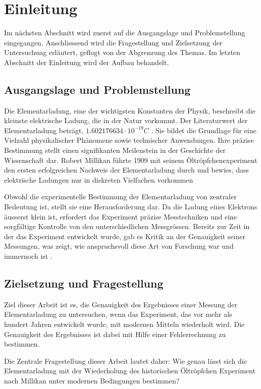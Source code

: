 \chapter{Einleitung}
Im nächsten Abschnitt wird zuerst auf die Ausgangslage und Problemstellung eingegangen. Anschliessend wird die Fragestellung und Zielsetzung der Untersuchung erläutert, geflogt von der Abgrenzung des Themas. Im letzten Abschnitt der Einleitung wird der Aufbau behandelt.

\section{Ausgangslage und Problemstellung}\label{sec:ausgangslage}
Die Elementarladung, eine der wichtigsten Konstanten der Physik, beschreibt die kleinste elektrische Ladung, die in der Natur vorkommt. Der Literaturwert der Elementarladung beträgt, $1.602176634 \cdot 10^{-19} C$ \parencite[123]{fundamentum_mathe}. Sie bildet die Grundlage für eine Vielzahl physikalischer Phänomene sowie technischer Anwendungen. Ihre präzise Bestimmung stellt einen signifikanten Meilenstein in der Geschichte der Wissenschaft dar. Robert Millikan führte 1909 mit seinem Öltröpfchenexperiment den ersten erfolgreichen Nachweis der Elementarladung durch und bewies, dass elektrische Ladungen nur in diskreten Vielfachen vorkommen \parencite{PhysRevSeriesI.32.349}

Obwohl die experimentelle Bestimmung der Elementarladung von zentraler Bedeutung ist, stellt sie eine Herausforderung dar. Da die Ladung eines Elektrons äusserst klein ist, erfordert das Experiment präzise Messtechniken und eine sorgfältige Kontrolle von den unterschiedlichen Messgrössen. Bereits zur Zeit in der das Experiment entwickelt wurde,  gab es Kritik an der Genauigkeit seiner Messungen, was zeigt, wie anspruchsvoll diese Art von Forschung war und immernoch ist \parencite{dewiki:247237013}.

\section{Zielsetzung und Fragestellung}\label{sec:zielsetzung}
Ziel dieser Arbeit ist es, die Genauigkeit des Ergebnisses einer Messung der Elementarladung zu untersuchen, wenn das Experiment, das vor mehr als hundert Jahren entwickelt wurde, mit modernen Mitteln wiederholt wird. Die Genauigkeit des Ergebnisses ist dabei mit Hilfe einer Fehlerrechnung zu bestimmen.

Die Zentrale Fragestellung dieser Arbeit lautet daher: \glqq Wie genau lässt sich die Elementarladung mit der Wiederholung des historischen Öltröpfchen Experiment nach Millikan unter modernen Bedingungen bestimmen? \grqq 

